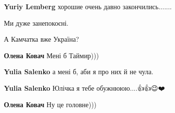 \begin{itemize}
\begin{itemize}
\textbf{Yuriy Lemberg} хорошие очень давно закончились.......
\end{itemize}

 
Ми дуже занепокоєні.

 
А Камчатка вже Україна?

\begin{itemize}
 
\textbf{Олена Ковач} Мені б Таймир)))

\begin{itemize}

 
\textbf{Yulia Salenko} а мені б, аби я про них й не чула.

 
\textbf{Yulia Salenko} Юлічка я тебе обужнююю....👍👍😉❤️

 
\textbf{Олена Ковач} Ну це головне)))
\end{itemize}

 

\end{itemize}
\end{itemize}
